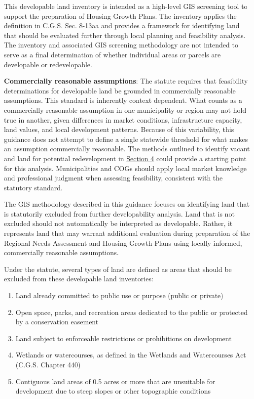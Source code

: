 \documentclass[
  letterpaper,
  DIV=11,
  numbers=noendperiod]{scrreprt}
\providecommand{\tightlist}{%
  \setlength{\itemsep}{0pt}\setlength{\parskip}{0pt}}
\begin{document}
This developable land inventory is intended as a high-level GIS
screening tool to support the preparation of Housing Growth Plans. The
inventory applies the definition in C.G.S. Sec. 8-13aa and provides a
framework for identifying land that should be evaluated further through
local planning and feasibility analysis. The inventory and associated
GIS screening methodology are not intended to serve as a final
determination of whether individual areas or parcels are developable or
redevelopable.

\textbf{Commercially reasonable assumptions}: The statute requires that
feasibility determinations for developable land be grounded in
commercially reasonable assumptions. This standard is inherently context
dependent. What counts as a commercially reasonable assumption in one
municipality or region may not hold true in another, given differences
in market conditions, infrastructure capacity, land values, and local
development patterns. Because of this variability, this guidance does
not attempt to define a single statewide threshold for what makes an
assumption commercially reasonable. The methods outlined to identify
vacant and land for potential redevelopment in
\href{vac_redev.qmd}{Section 4} could provide a starting point for this
analysis. Municipalities and COGs should apply local market knowledge
and professional judgment when assessing feasibility, consistent with
the statutory standard.

The GIS methodology described in this guidance focuses on identifying
land that is statutorily excluded from further developability analysis.
Land that is not excluded should not automatically be interpreted as
developable. Rather, it represents land that may warrant additional
evaluation during preparation of the Regional Needs Assessment and
Housing Growth Plans using locally informed, commercially reasonable
assumptions.

Under the statute, several types of land are defined as areas that
should be excluded from these developable land inventories:

\begin{enumerate}
\def\labelenumi{\Alph{enumi}.}
\tightlist
\item
  Land already committed to public use or purpose (public or private)
\item
  Open space, parks, and recreation areas dedicated to the public or
  protected by a conservation easement
\item
  Land subject to enforceable restrictions or prohibitions on
  development
\item
  Wetlands or watercourses, as defined in the Wetlands and Watercourses
  Act (C.G.S. Chapter 440)
\item
  Contiguous land areas of 0.5 acres or more that are unsuitable for
  development due to steep slopes or other topographic conditions
\end{enumerate}
\end{document}
